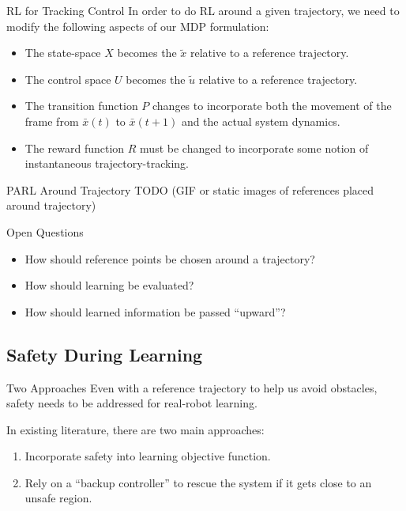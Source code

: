 \documentclass{beamer}
\begin{document}
\begin{frame}{RL for Tracking Control}
  In order to do RL around a given trajectory, we need to modify the following
  aspects of our MDP formulation:
  \begin{itemize}
    \item The state-space $X$ becomes the $\tilde{x}$ relative to a reference trajectory.
    \item The control space $U$ becomes the $\tilde{u}$ relative to a reference trajectory.
    \item The transition function $P$ changes to incorporate both the movement
      of the frame from $\bar{x}(t)$ to $\bar{x}(t+1)$ and the actual system
      dynamics.
    \item The reward function $R$ must be changed to incorporate some notion of
      instantaneous trajectory-tracking.
  \end{itemize}

\end{frame}

\begin{frame}{PARL Around Trajectory}
  TODO (GIF or static images of references placed around trajectory)
\end{frame}

\begin{frame}{Open Questions}
  \begin{itemize}
      \item How should reference points be chosen around a trajectory?
      \item How should learning be evaluated?
      \item How should learned information be passed ``upward''?
  \end{itemize}
\end{frame}

\subsection{Safety During Learning}

\begin{frame}{Two Approaches}
  Even with a reference trajectory to help us avoid obstacles, safety needs to
  be addressed for real-robot learning.
  
  In existing literature, there are two main approaches:
  \begin{enumerate}
      \item Incorporate safety into learning objective function.
      \item Rely on a ``backup controller'' to rescue the system if it gets
        close to an unsafe region.
  \end{enumerate}
\end{frame}
\end{document}
